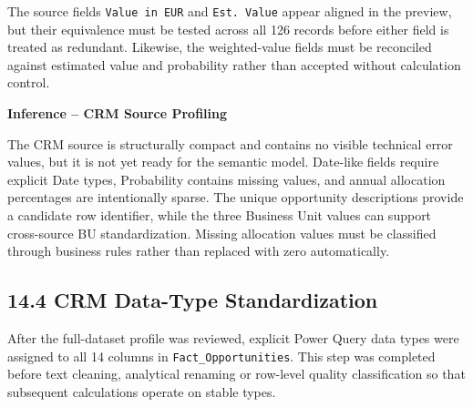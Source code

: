 \documentclass[11pt,a4paper]{article}
\begin{document}
The source fields \texttt{Value in EUR} and \texttt{Est. Value} appear aligned
in the preview, but their equivalence must be tested across all 126 records
before either field is treated as redundant. Likewise, the weighted-value
fields must be reconciled against estimated value and probability rather than
accepted without calculation control.

\begin{inferencebox}

\textbf{Inference -- CRM Source Profiling}

The CRM source is structurally compact and contains no visible technical error
values, but it is not yet ready for the semantic model. Date-like fields require
explicit Date types, Probability contains missing values, and annual allocation
percentages are intentionally sparse. The unique opportunity descriptions
provide a candidate row identifier, while the three Business Unit values can
support cross-source BU standardization. Missing allocation values must be
classified through business rules rather than replaced with zero automatically.

\end{inferencebox}

\subsection{14.4 CRM Data-Type Standardization}

After the full-dataset profile was reviewed, explicit Power Query data types
were assigned to all 14 columns in \texttt{Fact\_Opportunities}. This step was
completed before text cleaning, analytical renaming or row-level quality
classification so that subsequent calculations operate on stable types.
\end{document}
